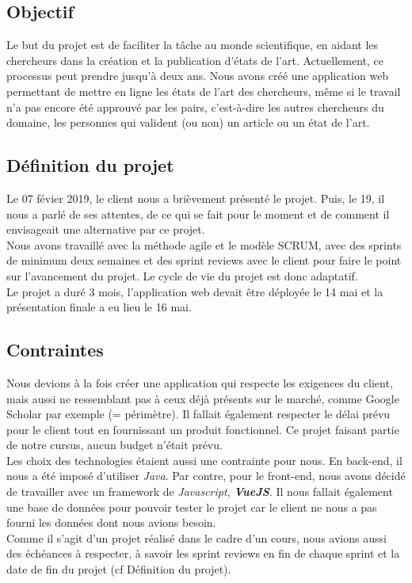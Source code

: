\documentclass[t, 12pt, usenames,dvipsnames]{article}
\begin{document}
        \subsection{Objectif}
            \noindent Le but du projet est de faciliter la tâche au monde scientifique, en aidant les chercheurs dans la création et la publication d'états de l'art. Actuellement, ce processus peut prendre jusqu'à deux ans. Nous avons créé une application web permettant de mettre en ligne les états de l'art des chercheurs, même si le travail n'a pas encore été approuvé par les pairs, c'est-à-dire les autres chercheurs du domaine, les personnes qui valident (ou non) un article ou un état de l'art.
    
        \subsection{Définition du projet}
            \noindent Le 07 févier 2019, le client nous a brièvement présenté le projet. Puis, le 19, il nous a parlé de ses attentes, de ce qui se fait pour le moment et de comment il envisageait une alternative par ce projet.\\
            Nous avons travaillé avec la méthode agile et le modèle SCRUM, avec des sprints de minimum deux semaines et des sprint reviews avec le client pour faire le point sur l'avancement du projet. Le cycle de vie du projet est donc adaptatif.\\
            Le projet a duré 3 mois, l'application web devait être déployée le 14 mai et la présentation finale a eu lieu le 16 mai.
        
        \subsection{Contraintes}
            \noindent Nous devions à la fois créer une application qui respecte les exigences du client, mais aussi ne ressemblant pas à ceux déjà présents sur le marché, comme Google Scholar par exemple (= périmètre). Il fallait également respecter le délai prévu pour le client tout en fournissant un produit fonctionnel. Ce projet faisant partie de notre cursus, aucun budget n'était prévu.\\
            Les choix des technologies étaient aussi une contrainte pour nous. En back-end, il nous a été imposé d'utiliser \textit{Java}. Par contre, pour le front-end, nous avons décidé de travailler avec un framework de \textit{Javascript}, \textbf{\textit{VueJS}}. Il nous fallait également une base de données pour pouvoir tester le projet car le client ne nous a pas fourni les données dont nous avions besoin.\\
            Comme il s'agit d'un projet réalisé dans le cadre d'un cours, nous avions aussi des échéances à respecter, à savoir les sprint reviews en fin de chaque sprint et la date de fin du projet (cf Définition du projet).
            
\end{document}
